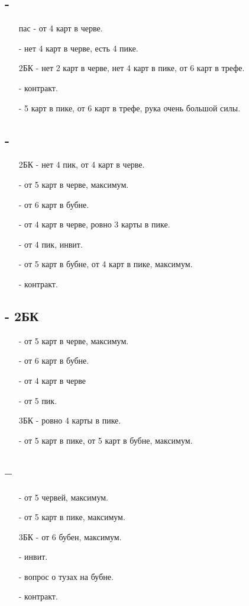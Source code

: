 \documentclass{article}
\begin{document}
\subsection{ - }
\begin{enumerate}
    \item[пас] - от 4 карт в черве.
    \item[\sp{2}] - нет 4 карт в черве, есть 4 пике.
    \item[2БК] - нет 2 карт в черве, нет 4 карт в пике, от 6 карт в трефе.
    \item[\cl{3}] - контракт.
    \item[\sp{3}] - 5 карт в пике, от 6 карт в трефе, рука очень большой силы.
\end{enumerate}
\subsection{ - }
\begin{enumerate}
    \item[2БК] - нет 4 пик, от 4 карт в черве.
    \item[\cl{3}] - от 5 карт в черве, максимум.
    \item[\di{3}] - от 6 карт в бубне.
    \item[\he{3}] - от 4 карт в черве, ровно 3 карты в пике.
    \item[\sp{3}] - от 4 пик, инвит.
    \item[\di{4}] - от 5 карт в бубне, от 4 карт в пике, максимум.
    \item[\sp{4}] - контракт.
\end{enumerate}
\subsection{ - 2БК}
\begin{enumerate}
    \item[\cl{3}] - от 5 карт в черве, максимум.
    \item[\di{3}] - от 6 карт в бубне.
    \item[\he{3}] - от 4 карт в черве
    \item[\sp{3}] - от 5 пик.
    \item[3БК] - ровно 4 карты в пике.
    \item[\di{4}] - от 5 карт в пике, от 5 карт в бубне, максимум.
\end{enumerate}
\subsection{ -- }
\begin{enumerate}
    \item[\he{3}] - от 5 червей, максимум.
    \item[\sp{3}] - от 5 карт в пике, максимум.
    \item[3БК] - от 6 бубен, максимум.
    \item[\di{4}] - инвит.
    \item[\he{4}] - вопрос о тузах на бубне.
    \item[\di{5}] - контракт.
\end{enumerate}
\end{document}
